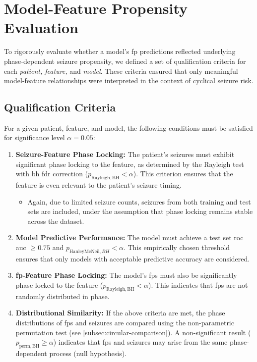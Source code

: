 \section{Model-Feature Propensity Evaluation} \label{sec:propensity-eval}

To rigorously evaluate whether a model's \gls{fp} predictions reflected underlying phase-dependent seizure propensity, we defined a set of qualification criteria for each \textit{patient, feature,} and \textit{model}.
These criteria ensured that only meaningful model-feature relationships were interpreted in the context of cyclical seizure risk.

\subsection{Qualification Criteria} \label{subsec:qualification-criteria}
For a given patient, feature, and model, the following conditions must be satisfied for significance level $\alpha = 0.05$:

\begin{enumerate}
    \item \textbf{Seizure-Feature Phase Locking:} The patient's seizures must exhibit significant phase locking to the feature, as determined by the Rayleigh test with \gls{bh} \gls{fdr} correction ($p_{\mathrm{Rayleigh, BH}} < \alpha$). This criterion ensures that the feature is even relevant to the patient's seizure timing.
    \begin{itemize}
        \item Again, due to limited seizure counts, seizures from both training and test sets are included, under the assumption that phase locking remains stable across the dataset.
    \end{itemize}
    \item \textbf{Model Predictive Performance:} The model must achieve a test set \gls{roc auc} $\geq 0.75$ and $p_{\mathrm{HanleyMcNeil}, BH}<\alpha$.
    This empirically chosen threshold ensures that only models with acceptable predictive accuracy are considered.
    \item \textbf{\gls{fp}-Feature Phase Locking:} The model's \glspl{fp} must also be significantly phase locked to the feature ($p_{\mathrm{Rayleigh, BH}} < \alpha$). This indicates that \glspl{fp} are not randomly distributed in phase.
    \item \textbf{Distributional Similarity:} If the above criteria are met, the phase distributions of \glspl{fp} and seizures are compared using the non-parametric permutation test (see \cref{subsec:circular-comparison}). A non-significant result ($p_{\mathrm{perm, BH}} \geq \alpha$) indicates that \glspl{fp} and seizures may arise from the same phase-dependent process (null hypothesis).
\end{enumerate}

